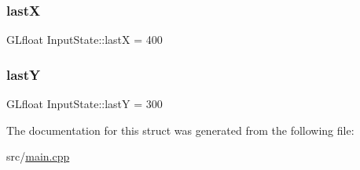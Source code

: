 \mbox{\label{structInputState_a5dd10a0ab1fc5f4275a26335d733c79b}} 
\subsubsection{\texorpdfstring{lastX}{lastX}}
{\footnotesize\ttfamily G\+Lfloat Input\+State\+::lastX = 400}

\mbox{\label{structInputState_a0eda88bc636b0b2a150caa48310a05e3}} 
\subsubsection{\texorpdfstring{lastY}{lastY}}
{\footnotesize\ttfamily G\+Lfloat Input\+State\+::lastY = 300}



The documentation for this struct was generated from the following file\+:\begin{DoxyCompactItemize}
\item 
src/\hyperlink{main_8cpp}{main.\+cpp}\end{DoxyCompactItemize}
